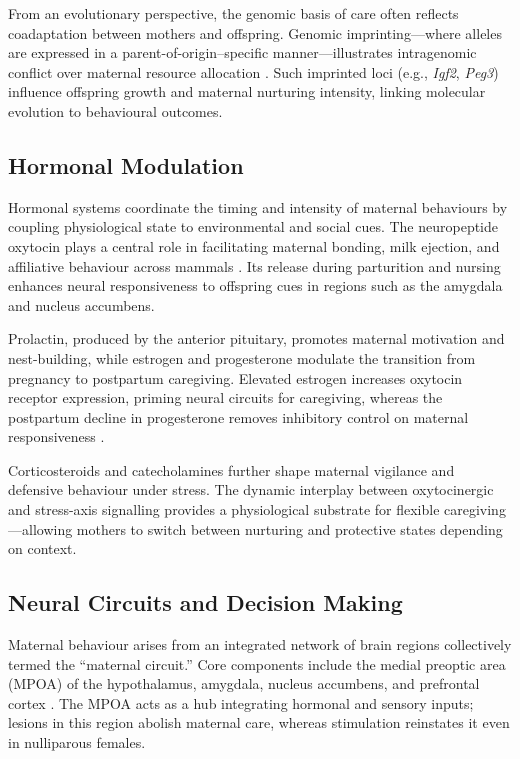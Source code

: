         From an evolutionary perspective, the genomic basis of care often reflects coadaptation between mothers and offspring.  Genomic imprinting—where alleles are expressed in a parent-of-origin–specific manner—illustrates intragenomic conflict over maternal resource allocation \cite{haig2014}.  Such imprinted loci (e.g., \textit{Igf2}, \textit{Peg3}) influence offspring growth and maternal nurturing intensity, linking molecular evolution to behavioural outcomes.

    \subsection{Hormonal Modulation}

        Hormonal systems coordinate the timing and intensity of maternal behaviours by coupling physiological state to environmental and social cues.  The neuropeptide oxytocin plays a central role in facilitating maternal bonding, milk ejection, and affiliative behaviour across mammals \cite{numan2006, bales2015}.  Its release during parturition and nursing enhances neural responsiveness to offspring cues in regions such as the amygdala and nucleus accumbens.
        
        Prolactin, produced by the anterior pituitary, promotes maternal motivation and nest-building, while estrogen and progesterone modulate the transition from pregnancy to postpartum caregiving.  Elevated estrogen increases oxytocin receptor expression, priming neural circuits for caregiving, whereas the postpartum decline in progesterone removes inhibitory control on maternal responsiveness \cite{rosenblatt1994}.  
        
        Corticosteroids and catecholamines further shape maternal vigilance and defensive behaviour under stress.  The dynamic interplay between oxytocinergic and stress-axis signalling provides a physiological substrate for flexible caregiving—allowing mothers to switch between nurturing and protective states depending on context.
        
    \subsection{Neural Circuits and Decision Making}
        Maternal behaviour arises from an integrated network of brain regions collectively termed the ``maternal circuit.''  Core components include the medial preoptic area (MPOA) of the hypothalamus, amygdala, nucleus accumbens, and prefrontal cortex \cite{numan2018, dulac2014}.  The MPOA acts as a hub integrating hormonal and sensory inputs; lesions in this region abolish maternal care, whereas stimulation reinstates it even in nulliparous females.
        
